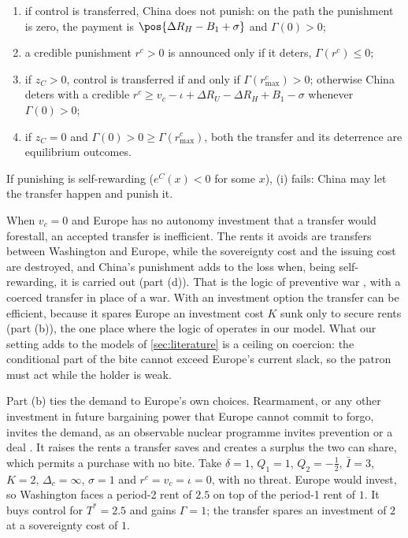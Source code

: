 \begin{corollary}
\begin{enumerate}[label=(\alph*)]
\begin{enumerate}[label=(\roman*)]
\item if control is transferred, China does not punish: on the path the punishment is zero, the payment is $\pos{\Delta R_H-B_1+\sigma}$ and $\Gamma(0)>0$;
\item a credible punishment $r^c>0$ is announced only if it deters, $\Gamma(r^c)\le 0$;
\item if $z_C>0$, control is transferred if and only if $\Gamma(r^c_{\max})>0$; otherwise China deters with a credible $r^c\ge v_c-\iota+\Delta R_U-\Delta R_H+B_1-\sigma$ whenever $\Gamma(0)>0$;
\item if $z_C=0$ and $\Gamma(0)>0\ge\Gamma(r^c_{\max})$, both the transfer and its deterrence are equilibrium outcomes.
\end{enumerate}
If punishing is self-rewarding ($e^C(x)<0$ for some $x$), (i) fails: China may let the transfer happen and punish it.
\end{enumerate}
\end{corollary}

When $v_c=0$ and Europe has no autonomy investment that a transfer would forestall, an accepted transfer is inefficient. The rents it avoids are transfers between Washington and Europe, while the sovereignty cost and the issuing cost are destroyed, and China's punishment adds to the loss when, being self-rewarding, it is carried out (part (d)). That is the logic of preventive war \citep{fearon1995rationalist, powell2006war}, with a coerced transfer in place of a war. With an investment option the transfer can be efficient, because it spares Europe an investment cost $K$ sunk only to secure rents (part (b)), the one place where the logic of \citet{grossman1986costs} operates in our model. What our setting adds to the models of \cref{sec:literature} is a ceiling on coercion: the conditional part of the bite cannot exceed Europe's current slack, so the patron must act while the holder is weak.

Part (b) ties the demand to Europe's own choices. Rearmament, or any other investment in future bargaining power that Europe cannot commit to forgo, invites the demand, as an observable nuclear programme invites prevention or a deal \citep{debs2014known, spaniel2019bargaining}. It raises the rents a transfer saves and creates a surplus the two can share, which permits a purchase with no bite. Take $\delta=1$, $Q_1=1$, $Q_2=-\tfrac12$, $\bar I=3$, $K=2$, $\Delta_c=\infty$, $\sigma=1$ and $r^c=v_c=\iota=0$, with no threat. Europe would invest, so Washington faces a period-2 rent of $2.5$ on top of the period-1 rent of $1$. It buys control for $T^*=2.5$ and gains $\Gamma=1$; the transfer spares an investment of $2$ at a sovereignty cost of $1$.


